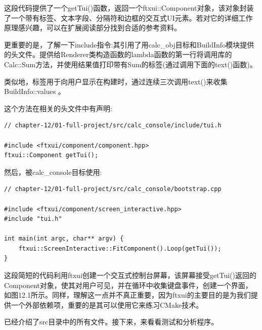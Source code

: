这段代码提供了一个getTui()函数，返回一个ftxui::Component对象，该对象封装了一个带有标签、文本字段、分隔符和边框的交互式UI元素。若对它的详细工作原理感兴趣，可以在扩展阅读部分找到合适的参考资料。

更重要的是，了解一下include指令:其引用了用calc\_obj目标和BuildInfo模块提供的头文件。提供给Renderer类构造函数的lambda函数的第一行将调用库的Calc::Sum方法，并使用结果值打印带有Sum的标签(通过调用下面的text()函数)。

类似地，标签用于向用户显示在构建时，通过连续三次调用text()来收集BuildInfo::values 。

这个方法在相关的头文件中有声明:

\begin{lstlisting}[style=styleCXX]
// chapter-12/01-full-project/src/calc_console/include/tui.h

#include <ftxui/component/component.hpp>
ftxui::Component getTui();
\end{lstlisting}

然后，被calc\_console目标使用:

\begin{lstlisting}[style=styleCXX]
// chapter-12/01-full-project/src/calc_console/bootstrap.cpp

#include <ftxui/component/screen_interactive.hpp>
#include "tui.h"

int main(int argc, char** argv) {
	ftxui::ScreenInteractive::FitComponent().Loop(getTui());
}
\end{lstlisting}

这段简短的代码利用ftxui创建一个交互式控制台屏幕，该屏幕接受getTui()返回的Component对象，使其对用户可见，并在循环中收集键盘事件，创建一个界面，如图12.1所示。同样，理解这一点并不真正重要，因为ftxui的主要目的是为我们提供一个外部依赖项，重要的是其可以使用它来练习CMake技术。

已经介绍了src目录中的所有文件。接下来，来看看测试和分析程序。





